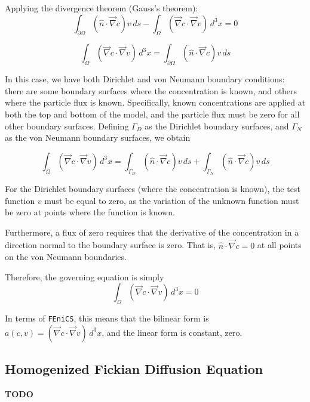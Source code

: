 \documentclass{article}
\begin{document}
Applying the divergence theorem (Gauss's theorem):
$$\int_{\partial\Omega} \left( \hat{n} \cdot \vec{\nabla} c \right) v\,ds
- \int_{\Omega} \left( \vec{\nabla}c \cdot \vec{\nabla}v \right) \,d^3x = 0$$

$$\int_{\Omega} \left( \vec{\nabla}c \cdot \vec{\nabla}v \right) \,d^3x =
\int_{\partial\Omega} \left( \hat{n} \cdot \vec{\nabla} c \right) v\,ds$$

In this case, we have both Dirichlet and von Neumann boundary conditions:
there are some boundary surfaces where the concentration is known,
and others where the particle flux is known.
Specifically, known concentrations are applied at both the top and bottom of the model,
and the particle flux must be zero for all other boundary surfaces.
Defining $\Gamma_D$ as the Dirichlet boundary surfaces,
and $\Gamma_N$ as the von Neumann boundary surfaces, we obtain

$$\int_{\Omega} \left( \vec{\nabla}c \cdot \vec{\nabla}v \right) \,d^3x =
\int_{\Gamma_D} \left( \hat{n} \cdot \vec{\nabla} c \right) v\,ds
+\int_{\Gamma_N} \left( \hat{n} \cdot \vec{\nabla} c \right) v\,ds$$

For the Dirichlet boundary surfaces (where the concentration is known),
the test function $v$ must be equal to zero,
as the variation of the unknown function must be zero at points where the function is known.

Furthermore, a flux of zero requires that the derivative of the concentration in a direction
normal to the boundary surface is zero.
That is, $\hat{n} \cdot \vec{\nabla} c = 0$ at all points on the von Neumann boundaries.

Therefore, the governing equation is simply
$$\int_{\Omega} \left( \vec{\nabla}c \cdot \vec{\nabla}v \right) \,d^3x = 0$$

In terms of \texttt{FEniCS}, this means that the bilinear form is
$a(c,v)=\left( \vec{\nabla}c \cdot \vec{\nabla}v \right) \,d^3x$,
and the linear form is constant, zero.

\subsection{Homogenized Fickian Diffusion Equation}\label{subsec:hom_fick}

\textbf{TODO}
\end{document}
